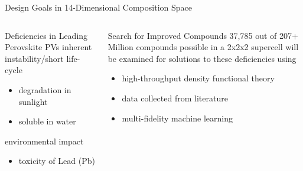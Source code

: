 \documentclass[10pt, aspectratio=169, presentation]{beamer}
\begin{document}
\begin{frame}[label={sec:orge78dd18}]{Design Goals in \alert{14-Dimensional} Composition Space}
\begin{columns}
\begin{column}{0.5\columnwidth}
\begin{block}{Deficiencies in Leading Perovskite PVs}
inherent instability/short life-cycle
\begin{itemize}
\item degradation in sunlight
\item soluble in water
\end{itemize}
environmental impact
\begin{itemize}
\item toxicity of Lead (Pb)
\end{itemize}
\end{block}

 
\begin{center}

\end{center}
\end{column}

\begin{column}{0.5\columnwidth}
 
\begin{center}

\end{center}

\begin{block}{Search for Improved Compounds}
\alert{37,785} out of \alert{207+ Million} compounds possible in a 2x2x2 supercell
will be examined for solutions to these deficiencies using
\begin{itemize}
\item high-throughput density functional theory
\item data collected from literature
\item multi-fidelity machine learning
\end{itemize}
\end{block}
\end{column}
\end{columns}
\end{frame}
\end{document}
